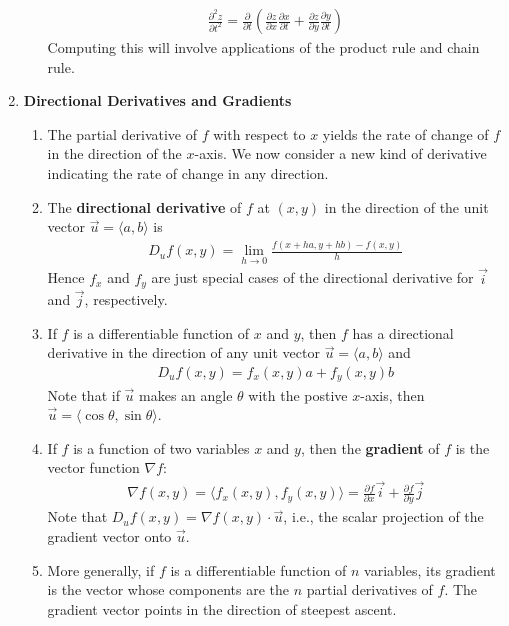 \documentclass[10pt]{article}
\begin{document}
\begin{multicols}{2}
\begin{enumerate}
\begin{enumerate}
        \begin{align*}
            \frac{\partial^2 z}{\partial t^2} = \frac{\partial}{\partial t} \left( \frac{\partial z}{\partial x} \frac{\partial x}{\partial t} + \frac{\partial z}{\partial y}\frac{\partial y}{\partial t} \right)
        \end{align*}
        Computing this will involve applications of the product rule and chain rule.
    \end{enumerate}
    \columnbreak
    \item \textbf{Directional Derivatives and Gradients}
    \begin{enumerate}
        \item The partial derivative of $f$ with respect to $x$ yields the rate of change of $f$ in the direction of the $x$-axis. We now consider a new kind of derivative indicating the rate of change in any direction.
        \item The \textbf{directional derivative} of $f$ at $(x, y)$ in the direction of the unit vector $\vec{u} = \langle a,b \rangle$ is
        \begin{align*}
            D_u f(x,y) = \lim_{h \rightarrow 0} \frac{f(x+ha, y+hb) - f(x,y)}{h}
        \end{align*}
        Hence $f_x$ and $f_y$ are just special cases of the directional derivative for $\vec{i}$ and $\vec{j}$, respectively.
        \item If $f$ is a differentiable function of $x$ and $y$, then $f$ has a directional derivative in the direction of any unit vector $\vec{u} = \langle a,b \rangle$ and 
        \begin{align*}
            D_u f(x,y) = f_x(x,y)a + f_y(x,y)b
        \end{align*}
        Note that if $\vec{u}$ makes an angle $\theta$ with the postive $x$-axis, then $\vec{u} =\langle \cos{\theta}, \sin{\theta} \rangle$.
        \item If $f$ is a function of two variables $x$ and $y$, then the \textbf{gradient} of $f$ is the vector function $\nabla f$:
        \begin{align*}
            \nabla f(x,y) = \langle f_x(x,y), f_y(x,y) \rangle = \frac{\partial f}{\partial x} \vec{i} + \frac{\partial f}{\partial y} \vec{j}
        \end{align*}
        Note that $D_u f(x,y) = \nabla f(x,y) \cdot \vec{u}$, i.e., the scalar projection of the gradient vector onto $\vec{u}$.
        \item More generally, if $f$ is a differentiable function of $n$ variables, its gradient is the vector whose components are the $n$ partial derivatives of $f$. The gradient vector points in the direction of steepest ascent.

\end{enumerate}
\end{enumerate}
\end{multicols}
\end{document}
